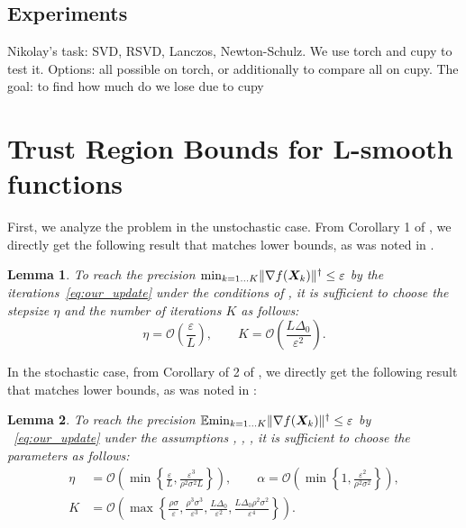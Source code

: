\documentclass{article} %
\newtheorem{lemma}{Lemma}
\newcommand{\norm}[1]{\lVert #1\rVert}
\renewcommand{\epsilon}{\varepsilon}
\newcommand{\cO}{\mathcal{O}}
\begin{document}
    \subsection{Experiments}
        Nikolay's task: SVD, RSVD, Lanczos, Newton-Schulz. We use torch and cupy to test it.
        Options: all possible on torch, or additionally to compare all on cupy. The goal: to find how much do we lose due to cupy

\section{Trust Region Bounds for L-smooth functions}
    First, we analyze the problem in the unstochastic case. From Corollary 1 of \cite{kovalev2025understanding}, we directly get the following result that matches lower bounds, as was noted in \cite{kovalev2025understanding}.


    \begin{lemma}\label{lemma:no_noise_tr}
    To reach the precision $\min_{k=1\ldots K} \norm{\nabla f(\mX_k)}^\dagger \leq \epsilon$ by the iterations~\eqref{eq:our_update} under the conditions of , it is sufficient to choose the stepsize $\eta$ and the number of iterations $K$ as follows:
    \begin{equation}\label{eq:unstoch_tr}
      \eta = \cO\left(\frac{\epsilon}{L}\right),\qquad K = \cO\left(\frac{L\Delta_0}{\epsilon^2}\right).
    \end{equation}
    \end{lemma}

    In the stochastic case, from Corollary of 2 of \cite{kovalev2025understanding}, we directly get the following result that matches lower bounds, as was noted in \cite{kovalev2025understanding}:

    \begin{lemma}\label{lemma:stoch_tr}
    To reach the precision $\E{\min_{k=1\ldots K} \norm{\nabla f(\mX_k)}^\dagger} \leq \epsilon$ by ~\eqref{eq:our_update} under the assumptions , , , it is sufficient to choose the parameters as follows:
    \begin{align}
        \eta &= \cO\left(\min\left\{\frac{\epsilon}{L}, \frac{\epsilon^3}{\rho^2\sigma^2L}\right\}\right),
        \qquad
        \alpha = \cO\left(\min\left\{1, \frac{\epsilon^2}{\rho^2\sigma^2}\right\}\right),
        \\
        \label{eq:str_K_nonconvex}
        K &= \cO\left(\max\left\{
            \frac{\rho\sigma}{\epsilon},
            \frac{\rho^3\sigma^3}{\epsilon^3},
            \frac{L\Delta_0}{\epsilon^2},
            \frac{L\Delta_0\rho^2\sigma^2}{\epsilon^4}
        \right\}\right).
    \end{align}
    \end{lemma}
\end{document}
